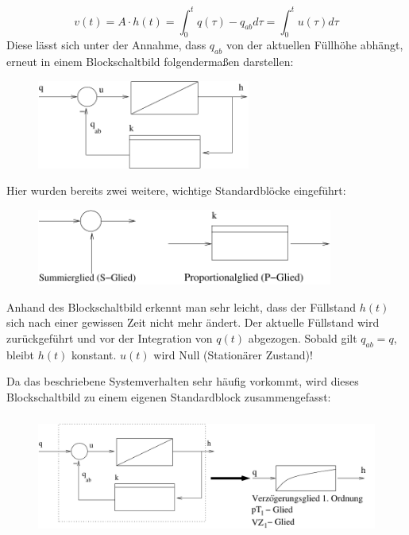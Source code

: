 \documentclass[12pt,a4paper,ngerman]{scrartcl}
\begin{document}
\begin{equation*}
 v(t)= A \cdot h(t)=\int_0^t{q(\tau)-q_{ab}d\tau}=\int_0^t{u(\tau)d\tau} 
\end{equation*}
Diese lässt sich unter der Annahme, dass $q_{ab}$ von der aktuellen Füllhöhe abhängt, erneut in einem Blockschaltbild folgendermaßen darstellen:
\begin{figure}[H]
\includegraphics[width=7cm]{sysregel_bsb2}
\end{figure}
Hier wurden bereits zwei weitere, wichtige Standardblöcke eingeführt:
\begin{figure}[H]
\includegraphics[height=2.5cm]{sysregel_spglied}
\end{figure}
Anhand des Blockschaltbild erkennt man sehr leicht, dass der Füllstand $h(t)$ sich nach einer gewissen Zeit nicht mehr ändert. Der aktuelle Füllstand wird zurückgeführt und vor der Integration von $q(t)$ abgezogen. Sobald gilt $q_{ab}=q$, bleibt $h(t)$ konstant. $u(t)$ wird Null (Stationärer Zustand)!

Da das beschriebene Systemverhalten sehr häufig vorkommt, wird dieses Blockschaltbild zu einem eigenen Standardblock zusammengefasst:
\begin{figure}[H]
\includegraphics[height=4cm]{sysregel_pt1}
\end{figure}
\end{document}
